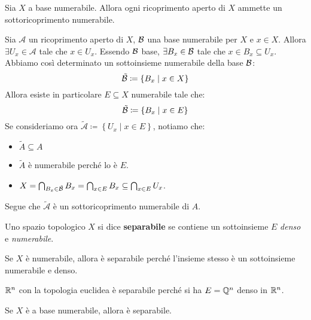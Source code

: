 \begin{proposition}
Sia $X$ a base numerabile. Allora ogni ricoprimento aperto di $X$ ammette un sottoricoprimento numerabile.
\end{proposition}
\begin{demonstration}
Sia $\mathcal{A}$ un ricoprimento aperto di $X$, $\mathcal{B}$ una base numerabile per $X$ e $x\in X$. Allora $\exists U_x\in\mathcal{A}$ tale che $x\in U_x$. Essendo $\mathcal{B}$ base, $\exists B_x\in\mathcal{B}$ tale che $x\in B_x\subseteq U_x$.\\
Abbiamo così determinato un sottoinsieme numerabile della base $\mathcal{B}$:
\begin{equation*}
\tilde{\mathcal{B}}\coloneqq\left\{B_x\mid x\in X\right\}
\end{equation*}
Allora esiste in particolare $E\subseteq X$ numerabile tale che:
\begin{equation*}
\tilde{\mathcal{B}}\coloneqq\left\{B_x\mid x\in E\right\}
\end{equation*}
Se consideriamo ora $\tilde{\mathcal{A}}\coloneqq\left\{U_x\mid x\in E\right\}$, notiamo che:
\begin{itemize}
	\item $\tilde{A}\subseteq A$
	\item $\tilde{A}$ è numerabile perché lo è $E$.
	\item $X=\mathop{{\bigcap}}\displaylimits_{B_x\in\tilde{\mathcal{B}}}B_x=\mathop{{\bigcap}}\displaylimits_{x\in E}B_x\subseteq \mathop{{\bigcap}}\displaylimits_{x\in E}U_x $.
\end{itemize}
Segue che $\tilde{\mathcal{A}}$ è un sottoricoprimento numerabile di $A$.
\end{demonstration}
\begin{define}
Uno spazio topologico $X$ si dice \textbf{separabile} se contiene un sottoinsieme $E$ \textit{denso} e \textit{numerabile}.
\end{define}
\begin{examples}
	\item Se $X$ è numerabile, allora è separabile perché l'insieme stesso è un sottoinsieme numerabile e denso.
	\item $\mathbb{R}^n$ con la topologia euclidea è separabile perché si ha $E=\mathbb{Q}^n$ denso in $\mathbb{R}^n$.
\end{examples}
\begin{lemming}
Se $X$ è a base numerabile, allora è separabile.
\end{lemming}
